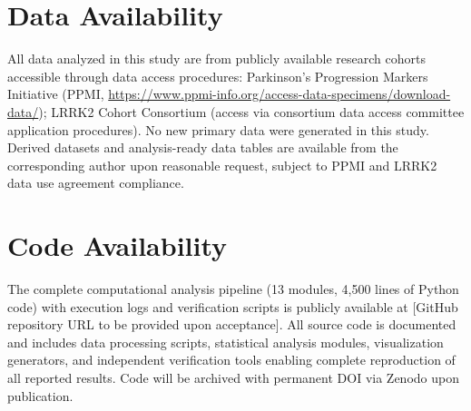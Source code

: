 \documentclass[11pt]{article}
\begin{document}
\section*{Data Availability}
All data analyzed in this study are from publicly available research cohorts accessible through data access procedures: Parkinson's Progression Markers Initiative (PPMI, \url{https://www.ppmi-info.org/access-data-specimens/download-data/}); LRRK2 Cohort Consortium (access via consortium data access committee application procedures). No new primary data were generated in this study. Derived datasets and analysis-ready data tables are available from the corresponding author upon reasonable request, subject to PPMI and LRRK2 data use agreement compliance.

\section*{Code Availability}
The complete computational analysis pipeline (13 modules, 4,500 lines of Python code) with execution logs and verification scripts is publicly available at [GitHub repository URL to be provided upon acceptance]. All source code is documented and includes data processing scripts, statistical analysis modules, visualization generators, and independent verification tools enabling complete reproduction of all reported results. Code will be archived with permanent DOI via Zenodo upon publication.
\end{document}
